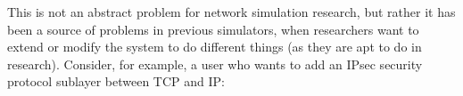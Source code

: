 \documentclass[letterpaper,10pt,english]{sphinxmanual}
\begin{document}
This is not an abstract problem for network simulation research, but rather it
has been a source of problems in previous simulators, when researchers want to
extend or modify the system to do different things (as they are apt to do in
research). Consider, for example, a user who wants to add an IPsec security
protocol sublayer between TCP and IP:

\begin{sphinxVerbatim}[commandchars=\\\{\}]
                   
                                
                   
                         
                    
                               
                    
                                      
\end{sphinxVerbatim}
\end{document}
